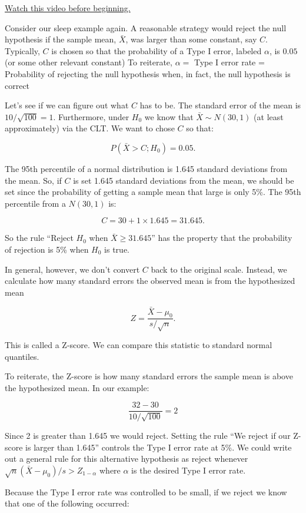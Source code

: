 \documentclass[]{article}
\begin{document}
\href{http://youtu.be/obNxIau2zrs?list=PLpl-gQkQivXiBmGyzLrUjzsblmQsLtkzJ}{Watch
this video before beginning.}

Consider our sleep example again. A reasonable strategy would reject the
null hypothesis if the sample mean, $\bar X$, was larger than some
constant, say $C$. Typically, $C$ is chosen so that the probability of a
Type I error, labeled $\alpha$, is $0.05$ (or some other relevant
constant) To reiterate, $\alpha =$ Type I error rate = Probability of
rejecting the null hypothesis when, in fact, the null hypothesis is
correct

Let's see if we can figure out what $C$ has to be. The standard error of
the mean is $10 / \sqrt{100} = 1$. Furthermore, under $H_0$ we know that
$\bar X \sim N(30, 1)$ (at least approximately) via the CLT. We want to
chose $C$ so that:

\[P(\bar X > C; H_0)=0.05.\]

The 95th percentile of a normal distribution is 1.645 standard
deviations from the mean. So, if $C$ is set 1.645 standard deviations
from the mean, we should be set since the probability of getting a
sample mean that large is only 5\%. The 95th percentile from a
$N(30, 1)$ is:

\[
C = 30 + 1 \times 1.645 = 31.645.
\]

So the rule ``Reject $H_0$ when $\bar X \geq 31.645$'' has the property
that the probability of rejection is 5\% when $H_0$ is true.

In general, however, we don't convert $C$ back to the original scale.
Instead, we calculate how many standard errors the observed mean is from
the hypothesized mean

\[
Z = \frac{\bar X - \mu_0}{s / \sqrt{n}}.
\]

This is called a Z-score. We can compare this statistic to standard
normal quantiles.

To reiterate, the Z-score is how many standard errors the sample mean is
above the hypothesized mean. In our example:

\[
\frac{32 - 30}{10 / \sqrt{100}} = 2
\]

Since 2 is greater than 1.645 we would reject. Setting the rule ``We
reject if our Z-score is larger than 1.645'' controls the Type I error
rate at 5\%. We could write out a general rule for this alternative
hypothesis as reject whenever
$\sqrt{n} (\bar X - \mu_0) / s > Z_{1-\alpha}$ where $\alpha$ is the
desired Type I error rate.

Because the Type I error rate was controlled to be small, if we reject
we know that one of the following occurred:
\end{document}
